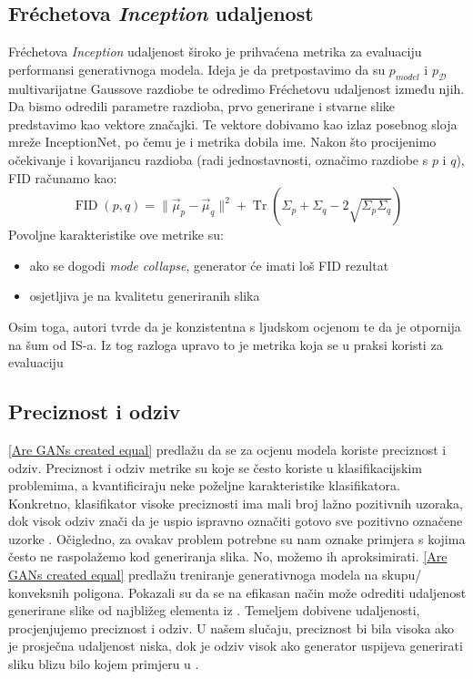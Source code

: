 \subsection{Fréchetova \textit{Inception} udaljenost}
Fréchetova \textit{Inception} udaljenost   široko je prihvaćena metrika za evaluaciju performansi generativnoga modela. Ideja je da pretpostavimo da su $p_{model}$ i $p_{\mathcal{D}}$ multivarijatne Gaussove razdiobe te odredimo Fréchetovu udaljenost između njih. Da bismo odredili parametre razdioba, prvo generirane i stvarne slike predstavimo kao vektore značajki. Te vektore dobivamo kao izlaz posebnog sloja mreže InceptionNet, po čemu je i metrika dobila ime. Nakon što procijenimo očekivanje i kovarijancu razdioba (radi jednostavnosti, označimo razdiobe s $p$ i $q$), FID računamo kao:
\begin{equation}
\operatorname*{FID}(p, q) = \|\vec{\mu}_p - \vec{\mu}_q\|^2 + \operatorname*{Tr}(\Sigma_p + \Sigma_q - 2\sqrt{\Sigma_p\Sigma_q})
\end{equation}
Povoljne karakteristike ove metrike su:
\begin{itemize}
	\item ako se dogodi \textit{mode collapse}, generator će imati loš FID rezultat
	\item osjetljiva je na kvalitetu generiranih slika
\end{itemize}
Osim toga, autori tvrde da je konzistentna s ljudskom ocjenom te da je otpornija na šum od IS-a. Iz tog razloga upravo to je metrika koja se u praksi koristi za evaluaciju

\subsection{Preciznost i odziv}
\ref{Are GANs created equal} predlažu da se za ocjenu modela koriste preciznost i odziv. Preciznost i odziv metrike su koje se često koriste u klasifikacijskim problemima, a kvantificiraju neke poželjne karakteristike klasifikatora. Konkretno, klasifikator visoke preciznosti ima mali broj lažno pozitivnih uzoraka, dok visok odziv znači da je uspio ispravno označiti gotovo sve pozitivno označene uzorke . Očigledno, za ovakav problem potrebne su nam oznake primjera s kojima često ne raspolažemo kod generiranja slika. No, možemo ih aproksimirati.
\ref{Are GANs created equal} predlažu treniranje generativnoga modela na skupu/ konveksnih poligona. Pokazali su da se na efikasan način može odrediti udaljenost generirane slike od najbližeg elementa iz . Temeljem dobivene udaljenosti, procjenjujemo preciznost i odziv. U našem slučaju, preciznost bi bila visoka ako je prosječna udaljenost niska, dok je odziv visok ako generator uspijeva generirati sliku blizu bilo kojem primjeru u .   
   
